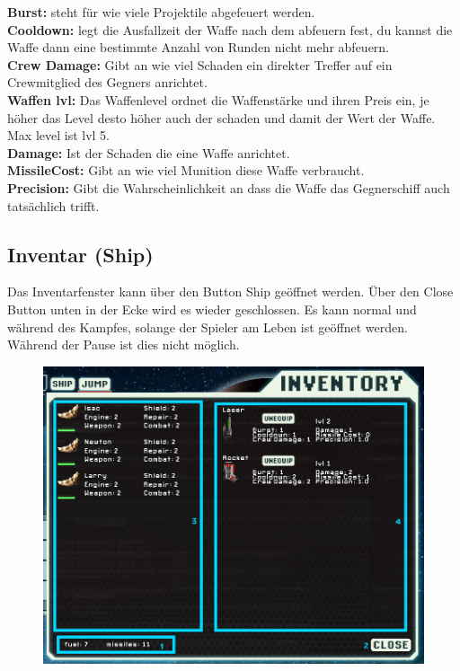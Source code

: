 \documentclass[fontsize=12pt,paper=a4,twoside]{scrartcl}
\begin{document}
\textbf{Burst:} steht für wie viele Projektile abgefeuert werden.
\\

\textbf{Cooldown:} legt die Ausfallzeit der Waffe nach dem abfeuern fest, du kannst die Waffe dann eine bestimmte Anzahl von Runden nicht mehr abfeuern.
\\

\textbf{Crew Damage:} Gibt an wie viel Schaden ein direkter Treffer 
auf ein Crewmitglied des Gegners anrichtet.
\\

\textbf{Waffen lvl:} Das Waffenlevel ordnet die Waffenstärke und ihren Preis ein, je höher das Level desto höher auch der schaden und damit der Wert der Waffe. Max level ist lvl 5.
\\

\textbf{Damage:} Ist der Schaden die eine Waffe anrichtet.
\\

\textbf{MissileCost:} Gibt an wie viel Munition diese Waffe verbraucht.
\\

\textbf{Precision:} Gibt die Wahrscheinlichkeit an dass die Waffe das Gegnerschiff auch tatsächlich trifft.

\subsection{Inventar (Ship)}

Das Inventarfenster kann über den Button Ship geöffnet werden. Über den Close Button unten in der Ecke wird es wieder geschlossen. Es kann normal und während des Kampfes, solange der Spieler am Leben ist geöffnet werden. Während der Pause ist dies nicht möglich. 

\begin{figure}[H]
\centering
\includegraphics[width=0.8\linewidth]{DasSpiel/Inventar/inventar.png}
\end{figure} 
\end{document}
